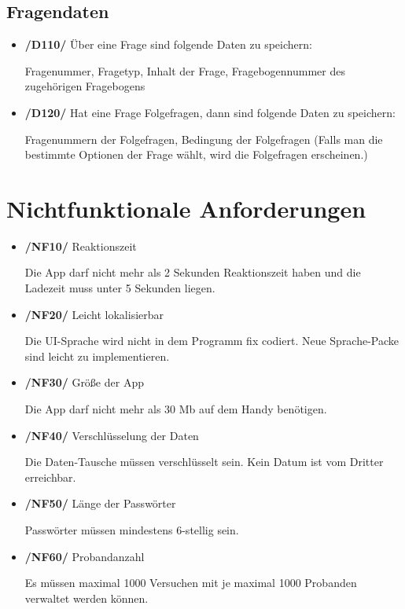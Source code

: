 \documentclass[a4paper]{scrreprt}
\begin{document}
        \section{Fragendaten}
            \begin{itemize}
                \item \textbf{/D110/} Über eine Frage sind folgende Daten zu speichern:
                    \par Fragenummer, Fragetyp, Inhalt der Frage, Fragebogennummer des zugehörigen Fragebogens

                \item \textbf{/D120/} Hat eine Frage Folgefragen, dann sind folgende Daten zu speichern:
                    \par Fragenummern der Folgefragen, Bedingung der Folgefragen (Falls man die bestimmte Optionen der Frage wählt, wird die Folgefragen erscheinen.)
            \end{itemize}

   \chapter{Nichtfunktionale Anforderungen}
        \begin{itemize}
            \item \textbf{/NF10/} Reaktionszeit
                \par Die App darf nicht mehr als 2 Sekunden Reaktionszeit haben und die Ladezeit muss unter 5 Sekunden liegen.

            \item \textbf{/NF20/} Leicht lokalisierbar
                \par Die UI-Sprache wird nicht in dem Programm fix codiert. Neue Sprache-Packe sind leicht zu implementieren.

            \item \textbf{/NF30/} Größe der App
                \par Die App darf nicht mehr als 30 Mb auf dem Handy benötigen.

            \item \textbf{/NF40/} Verschlüsselung der Daten
                \par Die Daten-Tausche müssen verschlüsselt sein. Kein Datum ist vom Dritter erreichbar.
                
            \item \textbf{/NF50/} Länge der Passwörter
                \par Passwörter müssen mindestens 6-stellig sein.
                
            \item \textbf{/NF60/} Probandanzahl
            \par Es müssen maximal 1000 Versuchen mit je maximal 1000 Probanden verwaltet werden können.
        \end{itemize}
\end{document}
